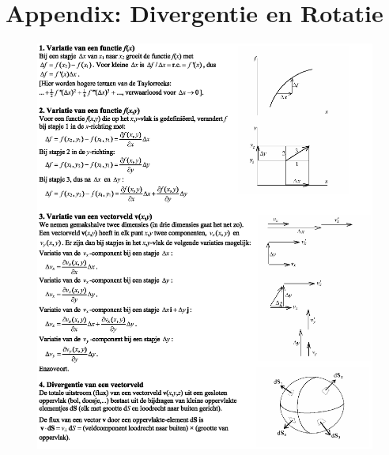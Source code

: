 
\section{Appendix: Divergentie en Rotatie}
\begin{figure}[hb]

\includegraphics[height=1.00\textwidth]{oefeningen.pictures/Div&Rot-1a}
\end{figure}
\newpage
